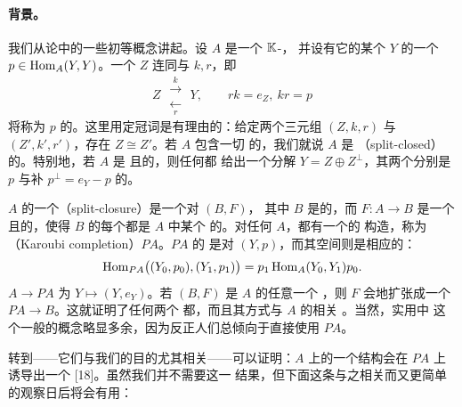 \paragraph{背景。}\label{sub:background}
我们从\trCategory{}论中的一些初等概念讲起。设 $A$ 是一个 $\mathbb{K}$-\trLinear{}\trCategory，
并设有它的某个\trObject{} $Y$ 的一个\trIdempotent{}\trEndomorphism{}%
$p\in\operatorname{Hom}_A(Y,Y)$。一个\trObject{} $Z$ 连同\trInclusionMap{}与\trRetract{}\trMorphism
$k,r$，即
\begin{equation}\label{eq:image-inclusion-retraction}
Z\;\substack{\xrightarrow{\;k\;}\\[-0.6ex]\xleftarrow[\;r\;]{}}\;Y,
\qquad rk=e_Z,\ kr=p
\end{equation}
将称为 $p$ 的\trImage。这里用定冠词是有理由的：给定两个三元组 $(Z,k,r)$ 与
$(Z',k',r')$，存在\trCanonical{}\trIsomorphism{} $Z\cong Z'$。若 $A$ 包含一切%
\trIdempotent{}\trEndomorphism{}的\trImage，我们就说 $A$ 是%
\textbf{\trSplitClosed}（split-closed）的。特别地，若 $A$ 是%
\trSplitClosed{}且\trAdditive{}的，则任何\trIdempotent{}\trEndomorphism{}都
给出一个\trDirectSum{}分解 $Y=Z\oplus Z^\perp$，其两个\trDirectSummand{}分别是
$p$ 与补\trProjection{} $p^\perp=e_Y-p$ 的\trImage。

\trCategory{} $A$ 的一个\textbf{\trSplitClosure}（split-closure）是一个对 $(B,F)$，
其中 $B$ 是\trSplitClosed{}的\trCategory，而 $F\colon A\to B$ 是一个%
\trFull{}且\trFaithful{}的\trEmbedding，使得 $B$ 的每个\trObject{}都是 $A$ 中某个%
\trIdempotent{}\trEndomorphism{}的\trImage。对任何 $A$，都有一个\trTautological{}的%
\trSplitClosure{}构造，称为\textbf{\trKaroubi{}\trCompletion}（Karoubi completion）$PA$。$PA$ 的%
\trObject{}是对 $(Y,p)$，而其\trMorphism{}空间则是相应的\trDirectSummand{}：
\begin{equation*}
\operatorname{Hom}_{PA}\bigl((Y_0,p_0),(Y_1,p_1)\bigr)=p_1\operatorname{Hom}_A(Y_0,Y_1)p_0.
\end{equation*}
\trEmbedding{} $A\to PA$ 为 $Y\mapsto(Y,e_Y)$。若 $(B,F)$ 是 $A$ 的任意一个%
\trSplitClosure，则
$F$ 会\trCanonical{}地扩张成一个\trEquivalence{} $PA\to B$。这就证明了任何两个%
\trSplitClosure{}都\trEquivalence，而且其方式与 $A$ 的相关\trEmbedding{}%
\trCompatible。当然，实用中
这个一般的\trSplitClosure{}概念略显多余，因为反正人们总倾向于直接使用 $PA$。

转到\trTriangulated{}\trCategory——它们与我们的目的尤其相关——可以证明：$A$
上的一个\trTriangulated{}结构会在 $PA$ 上诱导出一个 [18]。虽然我们并不需要这一
结果，但下面这条与之相关而又更简单的观察日后将会有用：

